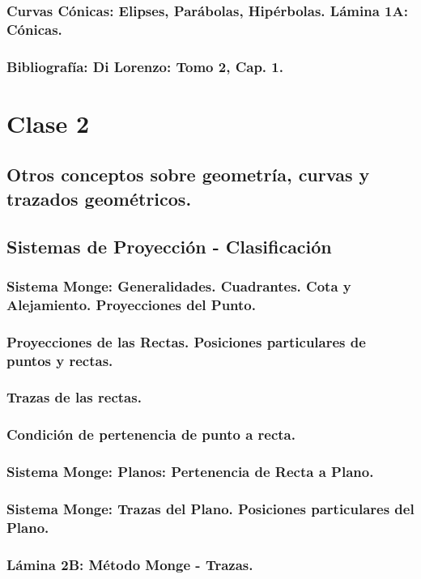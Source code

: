 \documentclass[12pt]{book}
\begin{document}
\subsection{Curvas Cónicas: Elipses, Parábolas, Hipérbolas. Lámina 1A: Cónicas.}
\subsection{Bibliografía: Di Lorenzo: Tomo 2, Cap. 1.}

\chapter{Clase 2 }

\section{Otros conceptos sobre geometría, curvas y trazados geométricos.}
\section{Sistemas de Proyección - Clasificación}
\subsection{Sistema Monge: Generalidades. Cuadrantes. Cota y Alejamiento. Proyecciones del Punto.}
\subsection{Proyecciones de las Rectas. Posiciones particulares de puntos y rectas.}
\subsection{Trazas de las rectas.}
\subsection{Condición de pertenencia de punto a recta.}
\subsection{Sistema Monge: Planos: Pertenencia de Recta a Plano.}
\subsection{Sistema Monge: Trazas del Plano. Posiciones particulares del Plano.}
\subsection{Lámina 2B: Método Monge - Trazas.}
\end{document}
